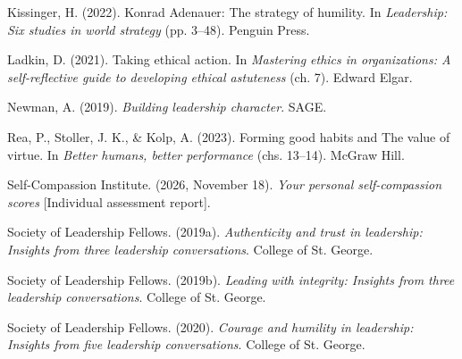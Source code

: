 \documentclass[12pt,letterpaper]{article}
\begin{document}
Kissinger, H. (2022). Konrad Adenauer: The strategy of humility. In \textit{Leadership: Six studies in world strategy} (pp. 3--48). Penguin Press.

Ladkin, D. (2021). Taking ethical action. In \textit{Mastering ethics in organizations: A self-reflective guide to developing ethical astuteness} (ch. 7). Edward Elgar.

Newman, A. (2019). \textit{Building leadership character}. SAGE.

Rea, P., Stoller, J. K., \& Kolp, A. (2023). Forming good habits and The value of virtue. In \textit{Better humans, better performance} (chs. 13--14). McGraw Hill.

Self-Compassion Institute. (2026, November 18). \textit{Your personal self-compassion scores} [Individual assessment report].

Society of Leadership Fellows. (2019a). \textit{Authenticity and trust in leadership: Insights from three leadership conversations}. College of St. George.

Society of Leadership Fellows. (2019b). \textit{Leading with integrity: Insights from three leadership conversations}. College of St. George.

Society of Leadership Fellows. (2020). \textit{Courage and humility in leadership: Insights from five leadership conversations}. College of St. George.
\end{document}
